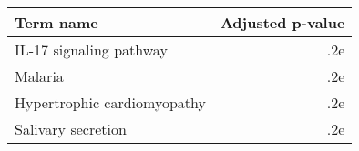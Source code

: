 \begin{tabular}{lr}
\toprule
                  Term name &  Adjusted p-value \\
\midrule
    IL-17 signaling pathway &               .2e \\
                    Malaria &               .2e \\
Hypertrophic cardiomyopathy &               .2e \\
         Salivary secretion &               .2e \\
\bottomrule
\end{tabular}
